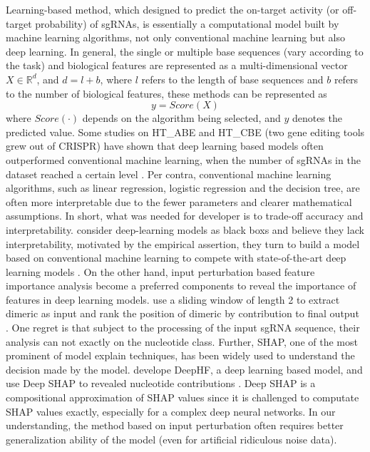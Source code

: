 \documentclass{bioinfo}
\begin{document}
Learning-based method, which designed to predict the on-target activity (or off-target probability) of sgRNAs, 
is essentially a computational model built by machine learning algorithms, not only conventional machine learning but also deep learning. 
In general, the single or multiple base sequences (vary according to the task) and biological features are represented as a multi-dimensional vector $X\in\mathbb{R}^d$, 
and $d=l+b$, where $l$ refers to the length of base sequences and $b$ refers to the number of biological features, these methods can be represented as
\begin{equation}
 y=Score( X)\label{eq:01}
\end{equation}
 where $Score(\cdot)$ depends on the algorithm being selected, and $y$ denotes the predicted value.
 Some studies on HT\_ABE and HT\_CBE (two gene editing tools grew out of CRISPR) have shown that deep learning based models often outperformed conventional machine learning, when the number of sgRNAs in the dataset reached a certain level \citep{kim2018deep,kim2019spcas9,Song2020}. 
 Per contra, conventional machine learning algorithms, such as linear regression, logistic regression and the decision tree, are often more interpretable due to the fewer parameters and clearer mathematical assumptions. 
 In short, what was needed for developer is to trade-off accuracy and interpretability. 
 \citeauthor{MuhammadRafid2020} consider deep-learning models as black boxs and believe they lack interpretability, 
 motivated by the empirical assertion, they turn to build a model based on conventional machine learning to compete with state-of-the-art deep learning models \citep{MuhammadRafid2020}. 
 On the other hand, input perturbation based feature importance analysis become a preferred components to reveal the importance of features in deep learning models. 
 \citeauthor{Liu2019} use a sliding window of length 2 to extract dimeric as input and rank the position of dimeric by contribution to final output \citep{Liu2019}. 
 One regret is that subject to the processing of the input sgRNA sequence, their analysis can not exactly on the nucleotide class. 
 Further, SHAP, one of the most prominent of model explain techniques, has been widely used to understand the decision made by the model. 
 \citeauthor{wang2019optimized} develope DeepHF, a deep learning based model, and use Deep SHAP to revealed nucleotide contributions \citep{wang2019optimized}. 
 Deep SHAP is a compositional approximation of SHAP values since it is challenged to computate SHAP values exactly, especially for a complex deep neural networks. 
 In our understanding, the method based on input perturbation often requires better generalization ability of the model (even for artificial ridiculous noise data). 
\end{document}
